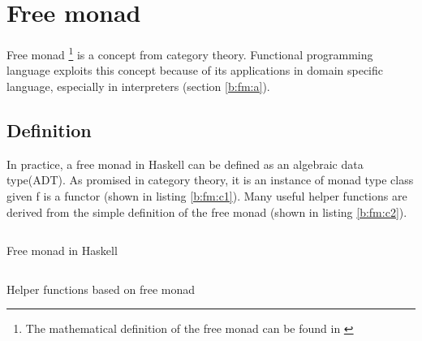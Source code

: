 \section{Free monad} \label{b:fm}
Free monad \footnote{The mathematical definition of the free monad can be found in \cite{contributorsCatsFreeMonads}} is a concept from category theory.
Functional programming language exploits this concept because of its applications in domain specific language, especially in interpreters (section \ref{b:fm:a}).
\subsection{Definition}
In practice, a free monad in Haskell can be defined as an algebraic data type(ADT). As promised in category theory, it is an instance of monad type class given f is a functor (shown in listing \ref{b:fm:c1}). Many useful helper functions are derived from the simple definition of the free monad (shown in listing \ref{b:fm:c2}).
\begin{code}
  \inputminted{haskell}{background/fm-construction.hs}
  \caption{Free monad in Haskell}
  \label{b:fm:c1}
\end{code}
\begin{code}
  \inputminted{haskell}{background/fm-helper.hs}
  \caption{Helper functions based on free monad}
  \label{b:fm:c2}
\end{code}
